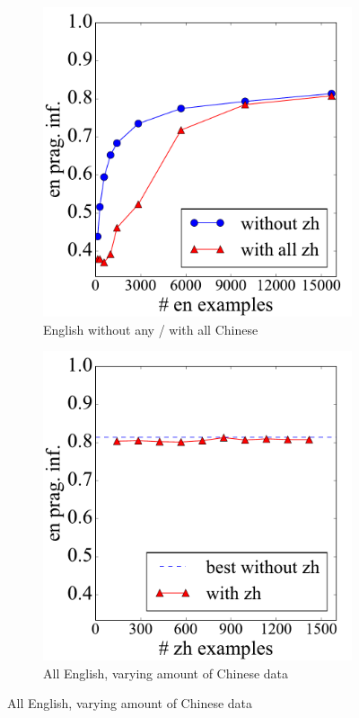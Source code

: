 \documentclass[11pt,a4paper]{article}
\renewcommand{\|}{\mid}
\begin{document}
\begin{figure}[t]
    \centering
    \begin{subfigure}[b]{0.465\columnwidth}
    \centering
    \includegraphics[width=\textwidth]{lowdata_azh2en_4way.pdf}
    \caption{English without any / with all Chinese}
    \label{fig:lowdata-azh2en}
    \end{subfigure}
    \hspace{0.04\columnwidth}
    \begin{subfigure}[b]{0.465\columnwidth}
    \centering
    \includegraphics[width=\textwidth]{lowdata_zh2aen_4way.pdf}
    \caption{All English, varying amount of Chinese data}
    \label{fig:lowdata-zh2aen}
    \end{subfigure}


\end{figure}
\end{document}
